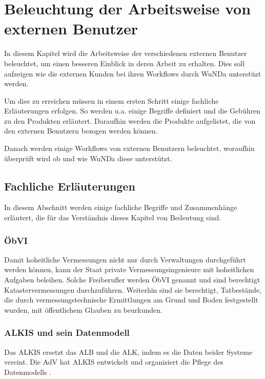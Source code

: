 \chapter{Beleuchtung der Arbeitsweise von externen Benutzer}

In diesem Kapitel wird die Arbeitsweise der verschiedenen externen Benutzer beleuchtet, um einen besseren Einblick in deren Arbeit zu erhalten.
Dies soll aufzeigen wie die externen Kunden bei ihren Workflows durch \ac{WuNDa} unterstüzt werden.

Um dies zu erreichen müssen in einem ersten Schritt einige fachliche Erläuterungen erfolgen. So werden u.a. einige Begriffe definiert und die Gebühren zu den Produkten erläutert. Daraufhin  werden die Produkte aufgelistet, die von den externen Benutzern bezogen werden können.

Danach werden einige Workflows von externen Benutzern beleuchtet, woraufhin überprüft wird ob und wie \ac{WuNDa} diese unterstützt.


\section{Fachliche Erläuterungen}
In diesem Abschnitt werden einige fachliche Begriffe und Zusammenhänge erläutert, die für das Verständnis dieses Kapitel von Bedeutung sind.

\subsection{ÖbVI}
Damit hoheitliche Vermessungen nicht nur durch Verwaltungen durchgeführt werden können, kann der Staat private Vermessungsingenieure mit hoheitlichen Aufgaben beleihen. Solche Freiberufler werden \acf{ÖbVI} genannt und sind berechtigt Katastervermessungen durchzuführen. Weiterhin sind sie berechtigt, Tatbestände, die durch vermessungstechnische Ermittlungen am Grund und Boden festgestellt wurden, mit öffentlichem Glauben zu beurkunden. \autocite[vgl.][]{bdvi-oebvi} 

\subsection{ALKIS und sein Datenmodell}
Das \acf{ALKIS} ersetzt das \acf{ALB} und die \acf{ALK}, indem es die Daten beider Systeme vereint. Die \acs{AdV} hat \acs{ALKIS} entwickelt und organisiert die Pflege des Datenmodells \autocite[vgl.][]{adv-alkis}.

